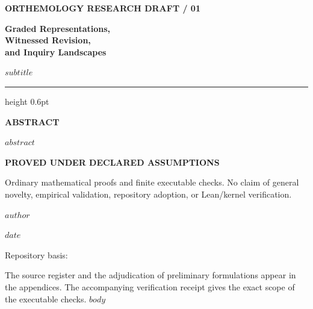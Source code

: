 \documentclass[11pt,a4paper]{article}
\begin{document}
\begin{titlepage}
\thispagestyle{empty}
\vspace*{5mm}
{\sffamily\small\bfseries\color{ink} ORTHEMOLOGY \hfill RESEARCH DRAFT / 01\par}
\vspace{15mm}
{\sffamily\fontsize{29}{34}\selectfont\bfseries\color{ink} Graded Representations,\\[2pt]Witnessed Revision,\\[2pt]and Inquiry Landscapes\par}
\vspace{6mm}
{\sffamily\large\color{softink} $subtitle$\par}
\vspace{10mm}
{\color{hairline}\hrule height 0.6pt}
\vspace{8mm}
{\sffamily\small\bfseries\color{ink} ABSTRACT\par}
\vspace{2mm}
$abstract$
\vfill
{\sffamily\small\bfseries\color{ink} PROVED UNDER DECLARED ASSUMPTIONS\par}
{\small Ordinary mathematical proofs and finite executable checks. No claim of general novelty, empirical validation, repository adoption, or Lean/kernel verification.\par}
\vspace{6mm}
{\sffamily\small $author$\par}
{\sffamily\small\color{softink} $date$\par}
\vspace{4mm}
{\footnotesize Repository basis: \par}
\end{titlepage}
\tableofcontents
\vspace{8mm}
{\small\color{softink} The source register and the adjudication of preliminary formulations appear in the appendices. The accompanying verification receipt gives the exact scope of the executable checks.}
\clearpage
{}
$body$
\end{document}
